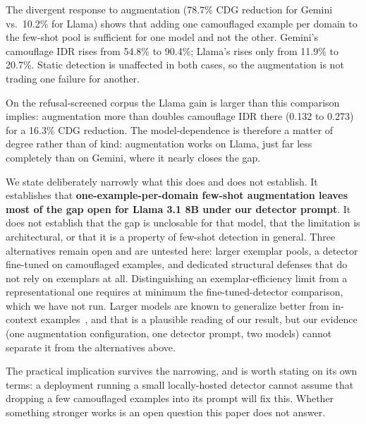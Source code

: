 \documentclass[11pt]{article}
\begin{document}
The divergent response to augmentation (78.7\% CDG reduction for Gemini vs.\ 10.2\% for Llama) shows that adding one camouflaged example per domain to the few-shot pool is sufficient for one model and not the other. Gemini's camouflage IDR rises from 54.8\% to 90.4\%; Llama's rises only from 11.9\% to 20.7\%. Static detection is unaffected in both cases, so the augmentation is not trading one failure for another.

On the refusal-screened corpus the Llama gain is larger than this comparison implies: augmentation more than doubles camouflage IDR there (0.132 to 0.273) for a 16.3\% CDG reduction. The model-dependence is therefore a matter of degree rather than of kind: augmentation works on Llama, just far less completely than on Gemini, where it nearly closes the gap.

We state deliberately narrowly what this does and does not establish. It establishes that \textbf{one-example-per-domain few-shot augmentation leaves most of the gap open for Llama 3.1 8B under our detector prompt}. It does not establish that the gap is unclosable for that model, that the limitation is architectural, or that it is a property of few-shot detection in general. Three alternatives remain open and are untested here: larger exemplar pools, a detector fine-tuned on camouflaged examples, and dedicated structural defenses that do not rely on exemplars at all. Distinguishing an exemplar-efficiency limit from a representational one requires at minimum the fine-tuned-detector comparison, which we have not run. Larger models are known to generalize better from in-context examples~\citep{brown2020gpt3}, and that is a plausible reading of our result, but our evidence (one augmentation configuration, one detector prompt, two models) cannot separate it from the alternatives above.


The practical implication survives the narrowing, and is worth stating on its own terms: a deployment running a small locally-hosted detector cannot assume that dropping a few camouflaged examples into its prompt will fix this. Whether something stronger works is an open question this paper does not answer.
\end{document}
